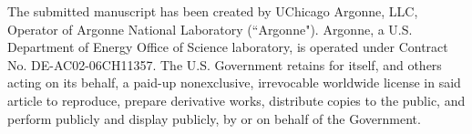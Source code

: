 \documentclass[12pt,fullpage]{report}
\begin{document}


\listoffigures


\printglossaries

\glsaddall


{}



The submitted manuscript has been created by UChicago Argonne, LLC, Operator of Argonne National Laboratory (``Argonne"). Argonne, a U.S. Department of Energy Office of Science laboratory, is operated under Contract No. DE-AC02-06CH11357. The U.S. Government retains for itself, and others acting on its behalf, a paid-up nonexclusive, irrevocable worldwide license in said article to reproduce, prepare derivative works, distribute copies to the public, and perform publicly and display publicly, by or on behalf of the Government.
\end{document}
